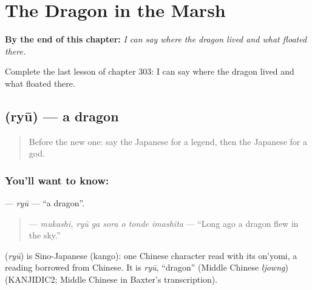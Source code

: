 
\chapter{The Dragon in the Marsh}
\label{ch:ja-the-dragon-in-the-marsh}

\begin{chapteropening}
\textbf{By the end of this chapter:} \emph{I can say where the dragon lived and what floated there.}

Complete the last lesson of chapter 303: I can say where the dragon lived and what floated there.
\end{chapteropening}

\section[\texorpdfstring{\ja{りゅう} (ryū)}{りゅう (ryū)}]{ (ryū) — a dragon}

\label{lesson:JA-C303-ryuu}



\begin{quote}
Before the new one: say the Japanese for a legend, then the Japanese for a god.
\end{quote}

\subsection*{You'll want to know: }
\textbf{} — \emph{ryū} — \textquotedblleft{}a dragon\textquotedblright{}.

\begin{quote}
\textbf{  } — \emph{mukashi, ryū ga sora o tonde imashita} — \textquotedblleft{}Long ago a dragon flew in the sky.\textquotedblright{}
\end{quote}

\begin{cousinweb}
\textbf{} (\emph{ryū}) is Sino-Japanese (kango): one Chinese character read with its on'yomi, a reading borrowed from Chinese. It is \emph{ryū}, \textquotedblleft{}dragon\textquotedblright{} (Middle Chinese \emph{ljowng}) (KANJIDIC2; Middle Chinese in Baxter's transcription).
\end{cousinweb}

